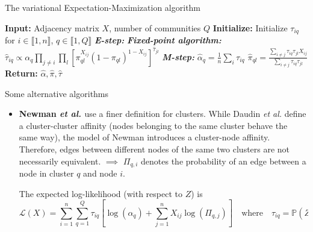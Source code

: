 \documentclass[final]{beamer}
\newlength{\colwidth}
\begin{document}
\begin{frame}[t]
\begin{columns}[t]
\begin{column}{\colwidth}
\begin{alertblock}{The variational Expectation-Maximization algorithm}
\begin{minipage}{.9\linewidth}
\begin{algorithm}[H]
\begin{algorithmic}[1]
              \State \textbf{Input:} Adjacency matrix $X$, number of communities $Q$
              \State \textbf{Initialize:} Initialize $\tau_{iq}$ for $i \in \llbracket 1, n \rrbracket$, $q \in \llbracket 1, Q \rrbracket$
              \State \textbf{\emph{E-step:}}
              \State \textbf{\emph{Fixed-point algorithm:}}
              \State $\hat{\tau}_{iq} \propto \alpha_q \prod_{j\neq i}\prod_l \left[\pi_{ql}^{X_{ij}}(1-\pi_{ql})^{1-X_{ij}}\right]^{\hat{\tau}_{jl}}$
              \EndFor
              \EndFor
              \State \textbf{\emph{M-step:}}
              \State $\hat{\alpha}_q = \frac{1}{n}\sum_{i} \tau_{iq}$ 
              \State $\hat{\pi}_{ql} = \frac{\sum_{i\neq j} \tau_{iq}\tau_{jl}X_{ij}}{\sum_{i\neq j} \tau_{iq}\tau_{jl}}$ 
              \EndFor
              \EndWhile
              \State \textbf{Return:} $\hat{\alpha}, \hat{\pi}, \hat{\tau}$
            \end{algorithmic}
          \end{algorithm}
        \end{minipage}

      \end{alertblock}

      \begin{block}{Some alternative algorithms}
        \begin{itemize}
          \item \justifying \textbf{Newman \textit{et al.} \cite{newman}} use a finer definition for clusters. While Daudin \textit{et al.} define a cluster-cluster affinity (nodes belonging to the same cluster behave the same way), the model of Newman introduces a cluster-node affinity. Therefore, edges between different nodes of the same two clusters are not necessarily equivalent. $\implies$ $\Pi_{q,i}$ denotes the probability of an edge between a node in cluster $q$ and node $i$.

                The expected log-likelihood (with respect to $Z$) is
                \begin{equation*}
                  \mathcal{L}(X) = \sum_{i=1}^n\sum_{q=1}^Q \tau_{iq} \left[ \log(\alpha_q) + \sum_{j=1}^n X_{ij} \log(\Pi_{q, j}) \right] \quad \text{where} \quad \tau_{iq} = \mathbb{P}(Z_{iq} = 1 | X, \alpha, \Pi).
                \end{equation*}


\end{itemize}
\end{block}
\end{column}
\end{columns}
\end{frame}
\end{document}
